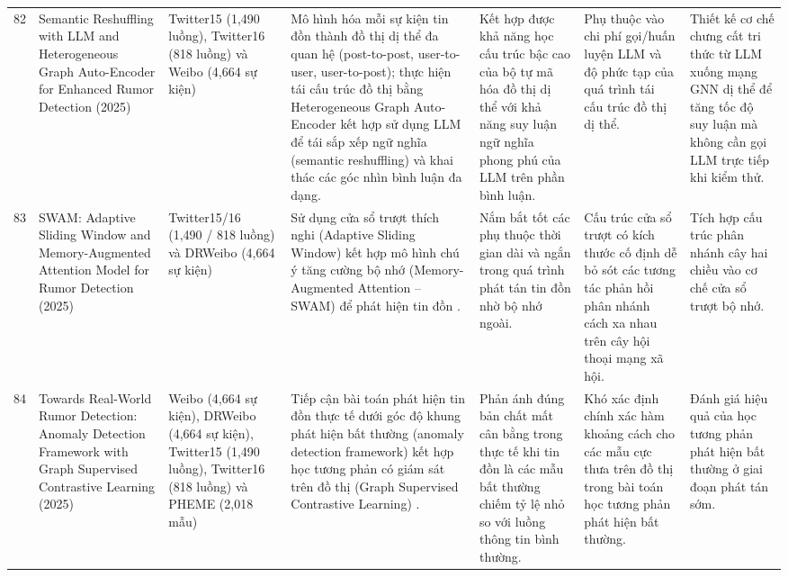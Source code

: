 \documentclass[11pt,a4paper]{extreport}
\begin{document}
\begin{landscape}
\begin{longtable}{@{}C{0.6cm}p{3.6cm}p{2.7cm}p{4.8cm}p{3.6cm}p{3.6cm}p{3.6cm}@{}}
82 & Semantic Reshuffling with LLM and Heterogeneous Graph Auto-Encoder for Enhanced Rumor Detection (2025) \cite{noauthor_semantic_2025-1} & Twitter15 (1,490 luồng), Twitter16 (818 luồng) và Weibo (4,664 sự kiện) & Mô hình hóa mỗi sự kiện tin đồn thành đồ thị dị thể đa quan hệ (post-to-post, user-to-user, user-to-post); thực hiện tái cấu trúc đồ thị bằng Heterogeneous Graph Auto-Encoder kết hợp sử dụng LLM để tái sắp xếp ngữ nghĩa (semantic reshuffling) và khai thác các góc nhìn bình luận đa dạng. & Kết hợp được khả năng học cấu trúc bậc cao của bộ tự mã hóa đồ thị dị thể với khả năng suy luận ngữ nghĩa phong phú của LLM trên phần bình luận. & Phụ thuộc vào chi phí gọi/huấn luyện LLM và độ phức tạp của quá trình tái cấu trúc đồ thị dị thể. & Thiết kế cơ chế chưng cất tri thức từ LLM xuống mạng GNN dị thể để tăng tốc độ suy luận mà không cần gọi LLM trực tiếp khi kiểm thử. \\ 

83 & SWAM: Adaptive Sliding Window and Memory-Augmented Attention Model for Rumor Detection (2025) \cite{noauthor_swam_2025} & Twitter15/16 (1,490 / 818 luồng) và DRWeibo (4,664 sự kiện) & Sử dụng cửa sổ trượt thích nghi (Adaptive Sliding Window) kết hợp mô hình chú ý tăng cường bộ nhớ (Memory-Augmented Attention -- SWAM) để phát hiện tin đồn \cite{noauthor_swam_2025}. & Nắm bắt tốt các phụ thuộc thời gian dài và ngắn trong quá trình phát tán tin đồn nhờ bộ nhớ ngoài. & Cấu trúc cửa sổ trượt có kích thước cố định dễ bỏ sót các tương tác phản hồi phân nhánh cách xa nhau trên cây hội thoại mạng xã hội. & Tích hợp cấu trúc phân nhánh cây hai chiều vào cơ chế cửa sổ trượt bộ nhớ. \\ 

84 & Towards Real-World Rumor Detection: Anomaly Detection Framework with Graph Supervised Contrastive Learning (2025) \cite{noauthor_towards_2025} & Weibo (4,664 sự kiện), DRWeibo (4,664 sự kiện), Twitter15 (1,490 luồng), Twitter16 (818 luồng) và PHEME (2,018 mẫu) & Tiếp cận bài toán phát hiện tin đồn thực tế dưới góc độ khung phát hiện bất thường (anomaly detection framework) kết hợp học tương phản có giám sát trên đồ thị (Graph Supervised Contrastive Learning) \cite{noauthor_towards_2025}. & Phản ánh đúng bản chất mất cân bằng trong thực tế khi tin đồn là các mẫu bất thường chiếm tỷ lệ nhỏ so với luồng thông tin bình thường. & Khó xác định chính xác hàm khoảng cách cho các mẫu cực thưa trên đồ thị trong bài toán học tương phản phát hiện bất thường. & Đánh giá hiệu quả của học tương phản phát hiện bất thường ở giai đoạn phát tán sớm. \\ 


\end{longtable}
\end{landscape}
\end{document}
